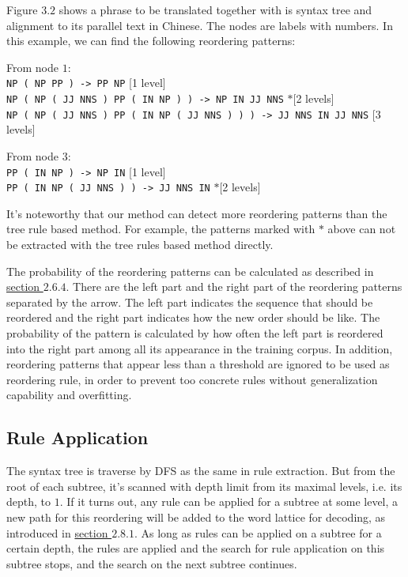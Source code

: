 Figure $3.2$ shows a phrase to be translated together with is syntax tree and alignment to its parallel text in Chinese. The nodes are labels with numbers. In this example, we can find the following reordering patterns:

From node $1$:\\
\texttt{NP ( {\color{blue}NP PP} ) -> PP NP} \hfill [1 level]\\
\texttt{NP ( NP ( {\color{blue}JJ NNS} ) PP ( {\color{blue}IN NP} ) ) -> NP IN JJ NNS} \hfill $*$[2 levels]\\
\texttt{NP ( NP ( {\color{blue}JJ NNS} ) PP ( {\color{blue}IN} NP ( {\color{blue}JJ NNS} ) ) ) -> JJ NNS IN JJ NNS} \hfill [3 levels]

From node $3$:\\
\texttt{PP ( {\color{blue}IN NP} ) -> NP IN} \hfill [1 level]\\
\texttt{PP ( {\color{blue}IN} NP ( {\color{blue}JJ NNS} ) ) -> JJ NNS IN} \hfill $*$[2 levels]

It's noteworthy that our method can detect more reordering patterns than the tree rule based method. For example, the patterns marked with $*$ above can not be extracted with the tree rules based method directly.

The probability of the reordering patterns can be calculated as described in \hyperref[general]{section $2.6.4$}. There are the left part and the right part of the reordering patterns separated by the arrow. The left part indicates the sequence that should be reordered and the right part indicates how the new order should be like. The probability of the pattern is calculated by how often the left part is reordered into the right part among all its appearance in the training corpus. In addition, reordering patterns that appear less than a threshold are ignored to be used as reordering rule, in order to prevent too concrete rules without generalization capability and overfitting.

\subsection{Rule Application}

The syntax tree is traverse by DFS as the same in rule extraction. But from the root of each subtree, it's scanned with depth limit from its maximal levels, i.e. its depth, to $1$. If it turns out, any rule can be applied for a subtree at some level, a new path for this reordering will be added to the word lattice for decoding, as introduced in \hyperref[latticecreation]{section $2.8.1$}. As long as rules can be applied on a subtree for a certain depth, the rules are applied and the search for rule application on this subtree stops, and the search on the next subtree continues. 

